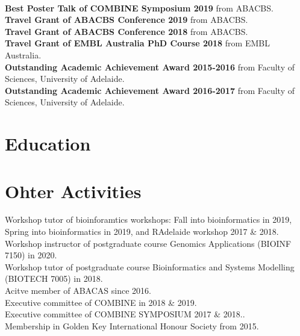 \documentclass[]{deedy-resume-openfont}
\begin{document}
\\
\textbf{Best Poster Talk of COMBINE Symposium 2019} from ABACBS.\\
\textbf{Travel Grant of ABACBS Conference 2019} from ABACBS.\\
\textbf{Travel Grant of ABACBS Conference 2018} from ABACBS.\\
\textbf{Travel Grant of EMBL Australia PhD Course 2018} from EMBL Australia.\\
\textbf{Outstanding Academic Achievement Award 2015-2016} from Faculty of Sciences, University of Adelaide.\\
\textbf{Outstanding Academic Achievement Award 2016-2017} from Faculty of Sciences, University of Adelaide.\\
\sectionsep

\section{Education}
\sectionsep

\sectionsep

\sectionsep

\section{Ohter Activities}
Workshop tutor of bioinforamtics workshops: Fall into bioinformatics in 2019, Spring into bioinformatics in 2019, and RAdelaide workshop 2017 \& 2018.
Workshop instructor of postgraduate course Genomics Applications (BIOINF 7150) in 2020.\\
Workshop tutor of postgraduate course Bioinformatics and Systems Modelling (BIOTECH 7005) in 2018.\\
Acitve member of ABACAS since 2016.\\
Executive committee of COMBINE in 2018 \& 2019.\\
Executive committee of COMBINE SYMPOSIUM 2017 \& 2018..\\
Membership in Golden Key International Honour Society from 2015.\\
\end{document}
